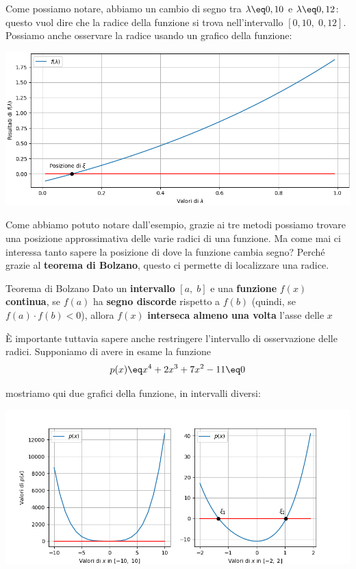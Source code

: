 \begin{example}
    Come possiamo notare, abbiamo un cambio di segno tra $\lambda \eq 0,10$ e $\lambda \eq 0,12$: questo vuol dire che la radice della funzione si trova nell'intervallo $[0,10, \; 0,12]$. Possiamo anche osservare la radice usando un grafico della funzione:
    \begin{center}
        \includegraphics[width=\linewidth]{assets/image-002.png}
    \end{center}
\end{example}

Come abbiamo potuto notare dall'esempio, grazie ai tre metodi possiamo trovare una posizione approssimativa delle varie radici di una funzione. Ma come mai ci interessa tanto sapere la posizione di dove la funzione cambia segno? Perché grazie al \textbf{teorema di Bolzano}, questo ci permette di localizzare una radice.

\begin{theorem}{Teorema di Bolzano}
    Dato un \textbf{intervallo} $[a, \; b]$ e una \textbf{funzione} $f(x)$ \textbf{continua}, se $f(a)$ ha \textbf{segno discorde} rispetto a $f(b)$ (quindi, se $f(a) \cdot f(b) < 0$), allora $f(x)$ \textbf{interseca almeno una volta} l'asse delle $x$
\end{theorem}

È importante tuttavia sapere anche restringere l'intervallo di osservazione delle radici. Supponiamo di avere in esame la funzione
\[ p(x) \eq x^4 + 2x^3 + 7x^2 - 11 \eq 0 \]

mostriamo qui due grafici della funzione, in intervalli diversi:
\begin{center}
    \includegraphics[width=\linewidth]{assets/image-003.png}
\end{center}

